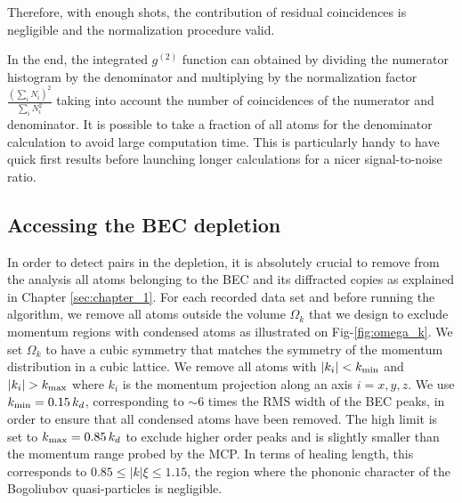 \noindent Therefore, with enough shots, the contribution of residual coincidences is negligible and the normalization procedure valid. 

In the end, the integrated $g^{(2)}$ function can obtained by dividing the numerator histogram by the denominator and multiplying by the normalization factor $\frac{(\sum_i N_i)^2}{\sum_i N_i^2}$ taking into account the number of coincidences of the numerator and denominator. It is possible to take a fraction of all atoms for the denominator calculation to avoid large computation time. This is particularly handy to have quick first results before launching longer calculations for a nicer signal-to-noise ratio.

\subsection{Accessing the BEC depletion}
\label{sec:accessing_depletion}

In order to detect \kmk pairs in the depletion, it is absolutely crucial to remove from the analysis all atoms belonging to the BEC and its diffracted copies as explained in Chapter \ref{sec:chapter_1}. For each recorded data set and before running the algorithm, we remove all atoms outside the volume $\Omega_k$ that we design to exclude momentum regions with condensed atoms as illustrated on Fig-\ref{fig:omega_k}. We set $\Omega_k$ to have a cubic symmetry that matches the symmetry of the momentum distribution in a cubic lattice. We remove all atoms with $|k_i| < k_{\rm{min}}$ and $|k_i| > k_{\rm{max}}$ where $k_i$ is the momentum projection along an axis $i=x,y,z$. We use $k_{\rm{min}}=0.15 \, k_d$, corresponding to $\sim 6$ times the RMS width of the BEC peaks, in order to ensure that all condensed atoms have been removed. The high limit is set to $k_{\rm{max}}=0.85 \, k_d$ to exclude higher order peaks and is slightly smaller than the momentum range probed by the MCP. In terms of healing length, this corresponds to $0.85 \leq | k | \xi \leq 1.15$, \ie the region where the phononic character of the Bogoliubov quasi-particles is negligible.

